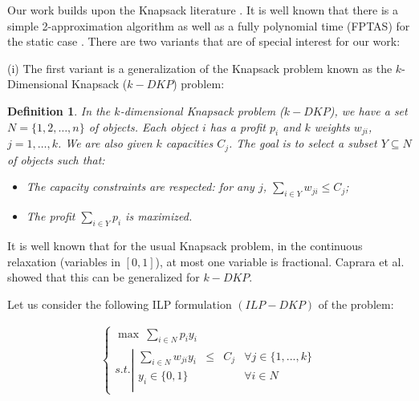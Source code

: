 \documentclass[a4paper]{book}
\newtheorem{definition}{Definition}
\begin{document}

Our work builds upon the {\sc Knapsack} literature \cite{Kelerrer}. It is well known that there is a simple 2-approximation algorithm as well as a fully polynomial time (FPTAS) for the static case \cite{Ibarra, Lawler, Magazine, Kellerer}. There are two variants that are of special interest for our work: 

(i) The first variant is a  generalization of the {\sc Knapsack} problem known as the $k$-{\sc Dimensional Knapsack} ($k-DKP$) problem:
\begin{definition}
In the $k$-dimensional {\sc Knapsack} problem ($k-DKP$), we have a set $N=\{1,2,\dots,n\}$ of objects. Each object $i$ has a profit $p_i$ and $k$ weights $w_{ji}$, $j=1,\dots,k$. We are also given $k$ capacities $C_j$. The goal is to select a subset $Y\subseteq N$ of objects such that:
\begin{itemize}
  \item The capacity constraints are respected: for any $j$, $\sum_{i\in Y}w_{ji}\leq C_j$;
  \item The profit $\sum_{i\in Y} p_i$ is maximized. 
\end{itemize} 
\end{definition}

It is well known that for the usual {\sc Knapsack} problem, in the continuous relaxation (variables in $[0,1]$), at most one variable is fractional. Caprara et al.
\cite{Carpara} showed that this can be generalized for $k-DKP$.

Let us consider the following ILP formulation $(ILP-DKP)$ of the problem:

   \begin{eqnarray*}
     \ \left \{ \begin{array}{ll}
    \max \ \sum\limits_{i \in N} p_{i} y_{i}   \\
    s.t. \left |
    \begin{array}{llllll}
    \sum\limits_{i \in N} w_{ji} y_{i} & \leq &C_j & \forall{j} \in \{1,...,k\} \\
    y_{i} \in \{0,1\} & & & \forall{i} \in N\\
    \end{array}
    \right.
    \end{array} 
    \right.
    \end{eqnarray*}
\end{document}

